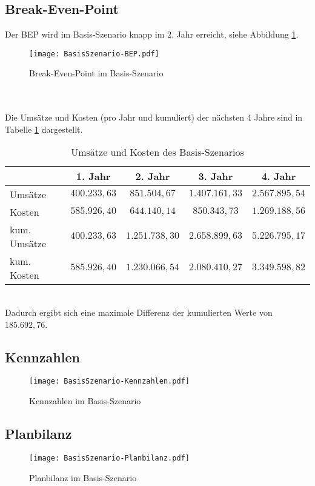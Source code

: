 \subsection{Break-Even-Point}
\label{sec:BasisSzenario-BEP}
Der BEP wird im Basis-Szenario knapp im 2. Jahr erreicht, siehe Abbildung \ref{fig:BasisSzenario-BEP}.
\begin{figure}[h]
	\centering
	\texttt{[image: BasisSzenario-BEP.pdf]}
	\caption{Break-Even-Point im Basis-Szenario}
	\label{fig:BasisSzenario-BEP}
\end{figure}\\
\\Die Umsätze und Kosten (pro Jahr und kumuliert) der nächsten 4 Jahre sind in Tabelle \ref{tab:BasisSzenario-BEP} dargestellt.
\begin{table}[h]
	\centering
	\begin{tabular}{|l|c|c|c|c|}
		\hline 
		& 1. Jahr & 2. Jahr & 3. Jahr & 4. Jahr \\ 
		\hline 
		Umsätze & $400.233,63$\officialeuro & $851.504,67$\officialeuro & $1.407.161,33$\officialeuro & $2.567.895,54$\officialeuro \\
		\hline 
		Kosten & $585.926,40$\officialeuro & $644.140,14$\officialeuro & $850.343,73$\officialeuro & $1.269.188,56$\officialeuro \\
		\hline 
		kum. Umsätze & $400.233,63$\officialeuro & $1.251.738,30$\officialeuro & $2.658.899,63$\officialeuro & $5.226.795,17$\officialeuro \\
		\hline 
		kum. Kosten & $585.926,40$\officialeuro & $1.230.066,54$\officialeuro & $2.080.410,27$\officialeuro & $3.349.598,82$\officialeuro \\
		\hline 
	\end{tabular}
	\caption{Umsätze und Kosten des Basis-Szenarios}
	\label{tab:BasisSzenario-BEP} 
\end{table}\\
Dadurch ergibt sich eine maximale Differenz der kumulierten Werte von $185.692,76$\officialeuro.

\subsection{Kennzahlen}
\begin{figure}[h]
	\centering
	\texttt{[image: BasisSzenario-Kennzahlen.pdf]}
	\caption{Kennzahlen im Basis-Szenario}
	\label{fig:BasisSzenario-Kennzahlen}
\end{figure}
\newpage
\subsection{Planbilanz}
\begin{figure}[h]
	\centering
	\texttt{[image: BasisSzenario-Planbilanz.pdf]}
	\caption{Planbilanz im Basis-Szenario}
	\label{fig:BasisSzenario-Planbilanz}
\end{figure}

